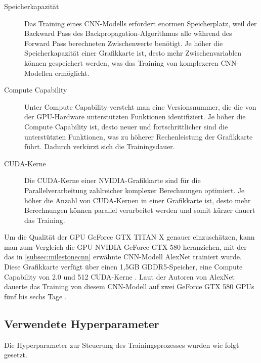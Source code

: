 \begin{description}
	\item[Speicherkapazität]

	Das Training eines CNN-Modells erfordert enormen Speicherplatz, weil der Backward Pass des Backpropagation-Algorithmus alle während des Forward Pass berechneten Zwischenwerte benötigt. Je höher die Speicherkapazität einer Grafikkarte ist, desto mehr Zwischenvariablen können gespeichert werden, was das Training von komplexeren CNN-Modellen ermöglicht.
	
	\item[Compute Capability] 
	
	Unter Compute Capability versteht man eine Versionsnummer, die die von der GPU-Hardware unterstützten Funktionen identifiziert. Je höher die Compute Capability ist, desto neuer und fortschrittlicher sind die unterstützten Funktionen, was zu höherer Rechenleistung der Grafikkarte führt. Dadurch verkürzt sich die Trainingsdauer.
	
	\item[CUDA-Kerne] 
	
	Die CUDA-Kerne einer NVIDIA-Grafikkarte sind für die Parallelverarbeitung zahlreicher komplexer Berechnungen optimiert. Je höher die Anzahl von CUDA-Kernen in einer Grafikkarte ist, desto mehr Berechnungen können parallel verarbeitet werden und somit kürzer dauert das Training.
\end{description}

Um die Qualität der GPU GeForce GTX TITAN X genauer einzuschätzen, kann man zum Vergleich die GPU NVIDIA GeForce GTX 580 heranziehen, mit der das in \autoref{subsec:milestonecnn} erwähnte CNN-Modell AlexNet trainiert wurde. Diese Grafikkarte verfügt über einen 1,5GB GDDR5-Speicher, eine Compute Capability von 2.0 und 512 CUDA-Kerne \cite{gtx580}. Laut der Autoren von AlexNet dauerte das Training von diesem CNN-Modell auf zwei GeForce GTX 580 GPUs fünf bis sechs Tage \cite[7]{10.1145/3065386}.

\subsection{Verwendete Hyperparameter}

Die Hyperparameter zur Steuerung des Trainingsprozesses wurden wie folgt gesetzt.

